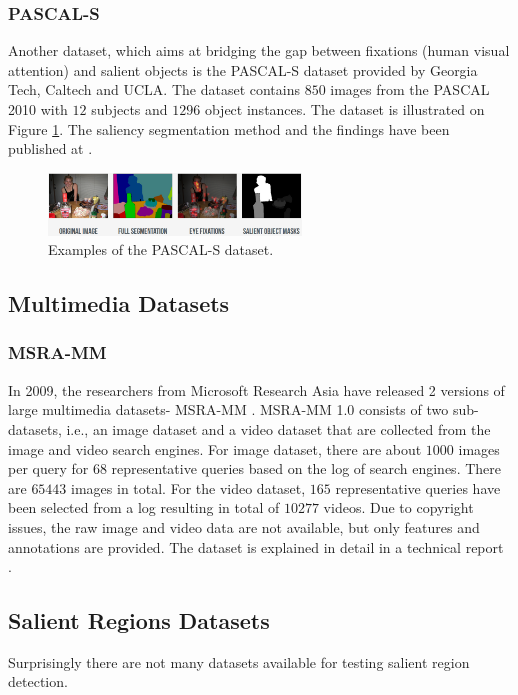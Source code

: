 \subsubsection{PASCAL-S}
Another dataset, which aims at bridging the gap between fixations (human visual attention) and salient objects is the PASCAL-S dataset \cite{pascal-s_db} provided by Georgia Tech, Caltech and UCLA. The dataset contains $850$ images from the PASCAL 2010 with $12$ subjects and $1296$ object instances. The dataset is illustrated on Figure \ref{fig:pascal-s}. The saliency segmentation method and the findings have been published at \cite{TPAMI.2012.147}.

\begin{figure}[H]
\begin{center}
\includegraphics[width=0.6\textwidth]{fig/PASCAL-S}
\end{center}
\caption{Examples of the PASCAL-S dataset.}
\label{fig:pascal-s}
\end{figure}


  

\subsection{Multimedia Datasets} \label{db:subsec:mmsal}
\subsubsection{MSRA-MM}
In 2009, the researchers from Microsoft Research Asia have released 2 versions of large multimedia datasets- MSRA-MM \cite{msra-mm_db}. MSRA-MM 1.0 consists of two sub-datasets, i.e., an image dataset and a video dataset that are collected from the image and video search engines. For image dataset, there are about $1000$ images per query for $68$ representative queries based on the log of search engines. There are $65443$ images in total. For the video dataset, $165$ representative queries have been selected from a log resulting in total of $10277$ videos. Due to copyright issues, the raw image and video data are not available, but only features and annotations are provided. The dataset is explained in detail in a technical report \cite{export:79942}.

\subsection{Salient Regions Datasets} \label{sec:salregdb}
Surprisingly there are not many datasets available for testing salient region detection.

